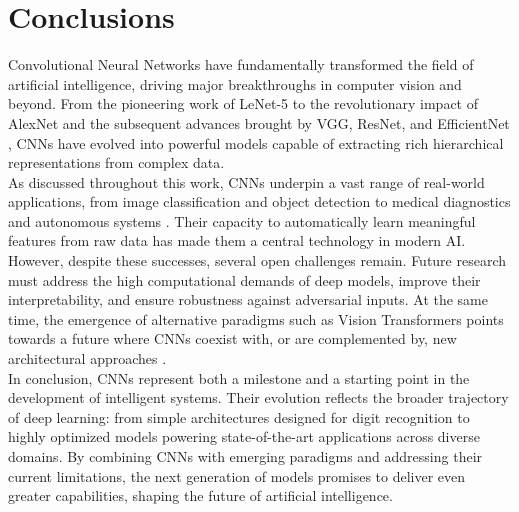 \chapter{Conclusions}

Convolutional Neural Networks have fundamentally transformed the field of artificial intelligence, driving major breakthroughs in computer vision and beyond.  
From the pioneering work of LeNet-5 \cite{lecun1998gradient} to the revolutionary impact of AlexNet \cite{krizhevsky2012imagenet} and the subsequent advances brought by VGG, ResNet, and EfficientNet \cite{simonyan2014very, he2015deep, tan2019efficientnet}, CNNs have evolved into powerful models capable of extracting rich hierarchical representations from complex data.
\\
As discussed throughout this work, CNNs underpin a vast range of real-world applications, from image classification and object detection to medical diagnostics and autonomous systems \cite{li2021survey, zhao2024review}.  
Their capacity to automatically learn meaningful features from raw data has made them a central technology in modern AI.
\\
However, despite these successes, several open challenges remain.  
Future research must address the high computational demands of deep models, improve their interpretability, and ensure robustness against adversarial inputs.  
At the same time, the emergence of alternative paradigms such as Vision Transformers points towards a future where CNNs coexist with, or are complemented by, new architectural approaches \cite{zhao2024review}.
\\
In conclusion, CNNs represent both a milestone and a starting point in the development of intelligent systems.  
Their evolution reflects the broader trajectory of deep learning: from simple architectures designed for digit recognition to highly optimized models powering state-of-the-art applications across diverse domains.  
By combining CNNs with emerging paradigms and addressing their current limitations, the next generation of models promises to deliver even greater capabilities, shaping the future of artificial intelligence.